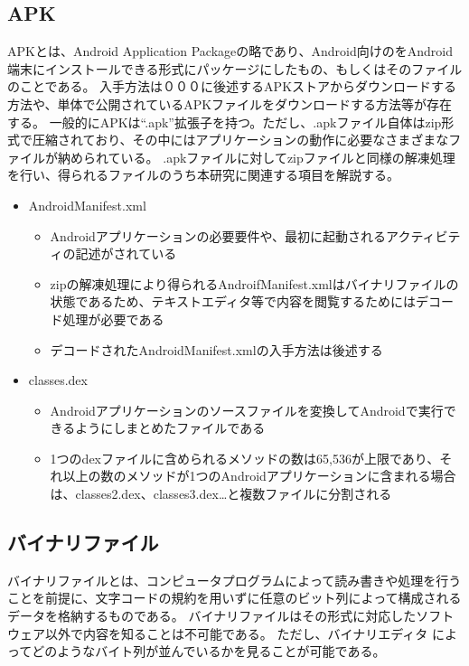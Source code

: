 \subsection{APK}
APKとは、Android Application Packageの略であり、Android向けのをAndroid端末にインストールできる形式にパッケージにしたもの、もしくはそのファイルのことである。
入手方法は０００に後述するAPKストアからダウンロードする方法や、単体で公開されているAPKファイルをダウンロードする方法等が存在する。
一般的にAPKは“.apk”拡張子を持つ。ただし、.apkファイル自体はzip形式で圧縮されており、その中にはアプリケーションの動作に必要なさまざまなファイルが納められている。
.apkファイルに対してzipファイルと同様の解凍処理を行い、得られるファイルのうち本研究に関連する項目を解説する。
\begin{itemize}
	\item  AndroidManifest.xml
		\begin{itemize}
			\item Androidアプリケーションの必要要件や、最初に起動されるアクティビティの記述がされている
			\item zipの解凍処理により得られるAndroifManifest.xmlはバイナリファイルの状態であるため、テキストエディタ等で内容を閲覧するためにはデコード処理が必要である
			\item デコードされたAndroidManifest.xmlの入手方法は後述する
		\end{itemize}
	\item classes.dex
		\begin{itemize}
			\item Androidアプリケーションのソースファイルを変換してAndroidで実行できるようにしまとめたファイルである
			\item 1つのdexファイルに含められるメソッドの数は65,536が上限であり、それ以上の数のメソッドが1つのAndroidアプリケーションに含まれる場合は、classes2.dex、classes3.dex…と複数ファイルに分割される
		\end{itemize}
\end{itemize}


\subsection{バイナリファイル}
バイナリファイルとは、コンピュータプログラムによって読み書きや処理を行うことを前提に、文字コードの規約を用いずに任意のビット列によって構成されるデータを格納するものである。
バイナリファイルはその形式に対応したソフトウェア以外で内容を知ることは不可能である。
ただし、バイナリエディタ
によってどのようなバイト列が並んでいるかを見ることが可能である。


